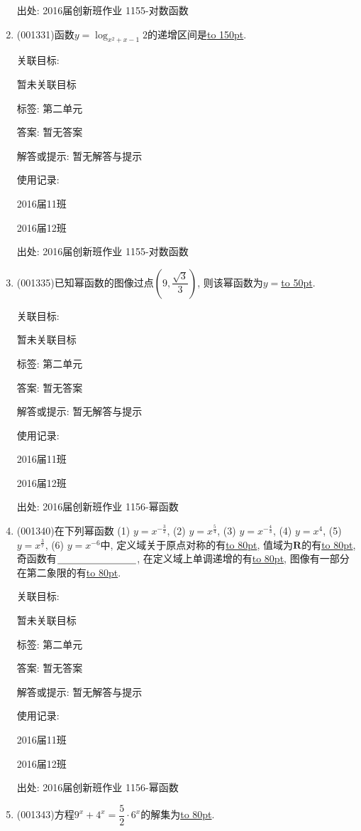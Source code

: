 \documentclass[10pt,a4paper]{article}
\newcommand{\blank}[1]{\underline{\hbox to #1pt{}}}
\begin{document}
\begin{enumerate}[1.]
出处: 2016届创新班作业	1155-对数函数
\item { (001331)}函数$y=\log_{x^2+x-1} 2$的递增区间是\blank{150}.


关联目标:

暂未关联目标



标签: 第二单元

答案: 暂无答案

解答或提示: 暂无解答与提示

使用记录:

2016届11班	

2016届12班	


出处: 2016届创新班作业	1155-对数函数
\item { (001335)}已知幂函数的图像过点$(9,\dfrac{\sqrt{3}}{3})$, 则该幂函数为$y=$\blank{50}.


关联目标:

暂未关联目标



标签: 第二单元

答案: 暂无答案

解答或提示: 暂无解答与提示

使用记录:

2016届11班	

2016届12班	


出处: 2016届创新班作业	1156-幂函数
\item { (001340)}在下列幂函数 (1) $y=x^{-\frac{3}{2}}$, (2) $y=x^{\frac{5}{4}}$, (3) $y=x^{-\frac{4}{3}}$, (4) $y=x^4$, (5) $y=x^{\frac{3}{7}}$, (6) $y=x^{-6}$中, 定义域关于原点对称的有\blank{80}, 值域为$\mathbf{R}$的有\blank{80}, 奇函数有$\blank{80}$, 在定义域上单调递增的有\blank{80}, 图像有一部分在第二象限的有\blank{80}.


关联目标:

暂未关联目标



标签: 第二单元

答案: 暂无答案

解答或提示: 暂无解答与提示

使用记录:

2016届11班	

2016届12班	


出处: 2016届创新班作业	1156-幂函数
\item { (001343)}方程$9^x+4^x=\dfrac{5}{2}\cdot 6^x$的解集为\blank{80}.



\end{enumerate}
\end{document}
